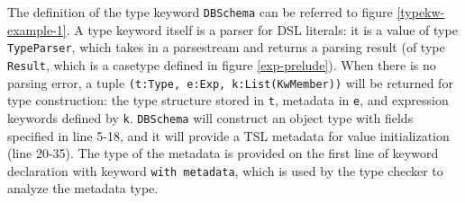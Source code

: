 \documentclass{sig-alternate}
\newcommand{\typekwparsercolor}[1]{\textcolor[HTML]{7C803E}{#1}}
\newcommand{\typecolor}[1]{\textcolor[HTML]{660066}{#1}}
\newcommand{\mycaption}[1]{\vspace{-4px}\caption{#1}\vspace{-2px}}
\begin{document}
The definition of the type keyword \verb|DBSchema| can be referred to figure \ref{typekw-example-1}. A type keyword itself is a parser for DSL literals: it is a value of type \verb|TypeParser|, which takes in a parsestream and returns a parsing result (of type \verb|Result|, which is a casetype defined in figure \ref{exp-prelude}). When there is no parsing error, a tuple \verb|(t:Type, e:Exp, k:List(KwMember))| will be returned for type construction: the type structure stored in \verb|t|, metadata in \verb|e|, and expression keywords defined by \verb|k|. \verb|DBSchema| will construct an object type with fields specified in line 5-18, and it will provide a TSL metadata for value initialization (line 20-35). The type of the metadata is provided on the first line of keyword declaration with keyword \verb|with metadata|, which is used by the type checker to analyze the metadata type.



\end{document}
